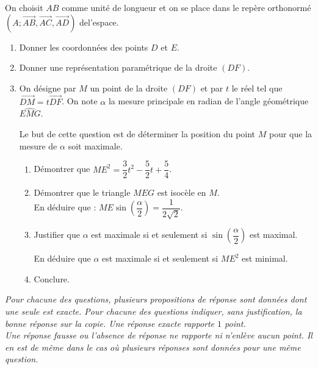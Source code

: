 \begin{colonne*exercice}
\begin{exercice}
  On choisit $AB$ comme unité de longueur et on se place dans le
  repère orthonormé
  $(A;\overrightarrow{AB},\overrightarrow{AC},\overrightarrow{AD})$
  de\linebreak l'espace.
  \begin{enumerate}
  \item Donner les coordonnées des points $D$ et $E$.
  \item Donner une représentation paramétrique de la droite $(DF)$.
  \item On désigne par $M$ un point de la droite $(DF)$ et par $t$ le
    réel tel que $\overrightarrow{DM}=t\overrightarrow{DF}$. On note
    $\alpha$ la mesure principale en radian de l'angle géométrique
    $\widehat{EMG}$.

    Le but de cette question est de déterminer la position du point
    $M$ pour que la mesure de $\alpha$ soit maximale.
    \begin{enumerate}
    \item Démontrer que
      $ME^2=\dfrac{3}{2}t^2-\dfrac{5}{2}t+\dfrac{5}{4}$.

      \vspace{2mm}

    \item Démontrer que le triangle $MEG$ est isocèle en $M$.\\
      En déduire que :
      $ME \sin(\dfrac{\alpha}{2})=\dfrac{1}{2\sqrt{2}}$.
    \item Justifier que $\alpha$ est maximale si et seulement si
      $\sin(\dfrac{\alpha}{2})$ est maximal.

      En déduire que $\alpha$ est maximale si et seulement si $ME^2$
      est minimal.
    \item Conclure.
    \end{enumerate}
  \end{enumerate}
\end{exercice}

\begin{exercice}

  \emph{Pour chacune des questions, plusieurs propositions de réponse
    sont données dont une seule est exacte. Pour chacune des questions
    indiquer, sans justification, la bonne réponse sur la copie. Une
    réponse exacte rapporte $1$ point.\\ Une réponse fausse ou l'absence
    de réponse ne rapporte ni n'enlève aucun point. Il en est de même
    dans le cas où plusieurs réponses sont données pour une même
    question.}


\end{exercice}
\end{colonne*exercice}
